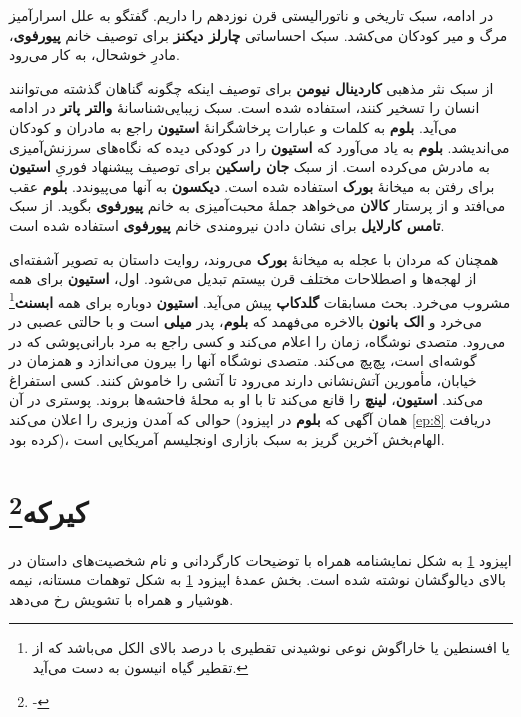 \documentclass[12pt]{book}
\newcommand{\noun}[1]{{\textbf{#1}}}
\begin{document}
    در ادامه، سبک تاریخی و ناتورالیستی قرن نوزدهم را داریم. گفتگو به علل اسرارآمیز مرگ و میر کودکان می‌کشد. سبک احساساتی \noun{چارلز دیکنز} برای توصیف خانم \noun{پیورفوی}، مادرِ خوشحال، به کار می‌رود.

    از سبک نثر مذهبی \noun{کاردینال نیومن} برای توصیف اینکه چگونه گناهان گذشته می‌توانند انسان را تسخیر کنند، استفاده شده است. سبک زیبایی‌شناسانهٔ \noun{والتر پاتر} در ادامه می‌آید. \noun{بلوم} به کلمات و عبارات پرخاشگرانهٔ \noun{استیون} راجع به مادران و کودکان می‌اندیشد. \noun{بلوم} به یاد می‌آورد که \noun{استیون} را در کودکی دیده که نگاه‌های سرزنش‌آمیزی به مادرش می‌کرده است. از سبک \noun{جان راسکین} برای توصیف پیشنهاد فوریِ \noun{استیون} برای رفتن به میخانهٔ \noun{بورک} استفاده شده است. \noun{دیکسون} به آنها می‌پیوندد. \noun{بلوم} عقب می‌افتد و از پرستار \noun{کالان} می‌خواهد جملهٔ محبت‌آمیزی به خانم \noun{پیورفوی} بگوید. از سبک \noun{تامس کارلایل} برای نشان دادن نیرومندی خانم \noun{پیورفوی} استفاده شده است.

    همچنان که مردان با عجله به میخانهٔ \noun{بورک} می‌روند، روایت داستان به تصویر آشفته‌ای از لهجه‌ها و اصطلاحات مختلف قرن بیستم تبدیل می‌شود. اول، \noun{استیون} برای همه مشروب می‌خرد. بحث مسابقات \noun{گلدکاپ} پیش می‌آید. \noun{استیون} دوباره برای همه \noun{ابسنث}\footnote{یا افسنطین یا خاراگوش نوعی نوشیدنی تقطیری با درصد بالای الکل می‌باشد که از تقطیر گیاه انیسون به دست می‌آید.} می‌خرد و \noun{الک بانون} بالاخره می‌فهمد که \noun{بلوم}، پدر \noun{میلی} است و با حالتی عصبی در می‌رود. متصدی نوشگاه، زمان را اعلام می‌کند و کسی راجع به مرد بارانی‌پوشی که در گوشه‌ای است، پچ‌پچ می‌کند. متصدی نوشگاه آنها را بیرون می‌اندازد و همزمان در خیابان، مأمورین آتش‌نشانی دارند می‌رود تا آتشی را خاموش کنند. کسی استفراغ می‌کند. \noun{استیون}، \noun{لینچ} را قانع می‌کند تا با او به محلهٔ فاحشه‌ها بروند. پوستری در آن حوالی که آمدن وزیری را اعلان می‌کند (همان آگهی که \noun{بلوم} در اپیزود \ref{ep:8} دریافت کرده بود)، الهام‌بخش آخرین گریز به سبک بازاری اونجلیسم آمریکایی است.

    \chapter[کیرکه]{کیرکه\protect\footnote{-}}\label{ep:15}
    اپیزود \ref{ep:15} به شکل نمایشنامه همراه با توضیحات کارگردانی و نام شخصیت‌های داستان در بالای دیالوگشان نوشته شده است. بخش عمدهٔ اپیزود \ref{ep:15} به شکل توهمات مستانه، نیمه هوشیار و همراه با تشویش رخ می‌دهد.
\end{document}
